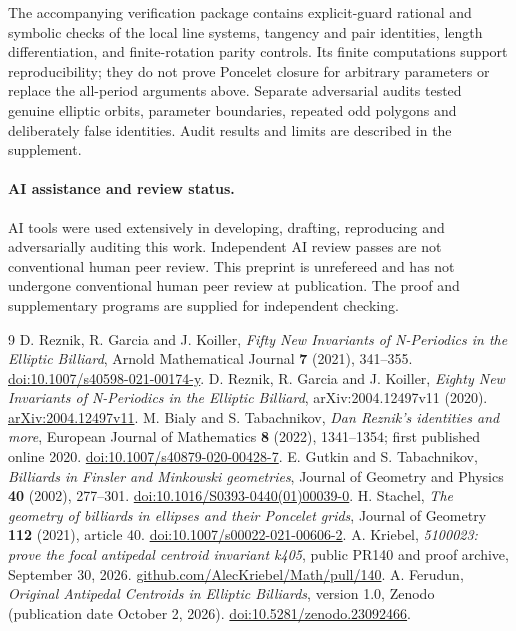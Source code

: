 \documentclass[11pt]{article}
\begin{document}
The accompanying verification package contains explicit-guard rational
and symbolic checks of the local line systems, tangency and pair
identities, length differentiation, and finite-rotation parity controls.
Its finite computations support reproducibility; they do not prove
Poncelet closure for arbitrary parameters or replace the all-period
arguments above. Separate adversarial audits tested genuine elliptic
orbits, parameter boundaries, repeated odd polygons and deliberately
false identities. Audit results and limits are described in the
supplement.

\paragraph{AI assistance and review status.}
AI tools were used extensively in developing, drafting, reproducing
and adversarially auditing this work. Independent AI review passes
are not conventional human peer review. This preprint is unrefereed
and has not undergone conventional human peer review at publication.
The proof and supplementary programs are supplied for independent
checking.

\begin{thebibliography}{9}
 D. Reznik, R. Garcia and J. Koiller,
\emph{Fifty New Invariants of N-Periodics in the Elliptic Billiard},
Arnold Mathematical Journal \textbf{7} (2021), 341--355.
\href{https://doi.org/10.1007/s40598-021-00174-y}{doi:10.1007/s40598-021-00174-y}.
 D. Reznik, R. Garcia and J. Koiller,
\emph{Eighty New Invariants of N-Periodics in the Elliptic Billiard},
arXiv:2004.12497v11 (2020).
\href{https://arxiv.org/abs/2004.12497v11}{arXiv:2004.12497v11}.
 M. Bialy and S. Tabachnikov,
\emph{Dan Reznik's identities and more}, European Journal of
Mathematics \textbf{8} (2022), 1341--1354; first published online 2020.
\href{https://doi.org/10.1007/s40879-020-00428-7}{doi:10.1007/s40879-020-00428-7}.
 E. Gutkin and S. Tabachnikov,
\emph{Billiards in Finsler and Minkowski geometries}, Journal of
Geometry and Physics \textbf{40} (2002), 277--301.
\href{https://doi.org/10.1016/S0393-0440(01)00039-0}{doi:10.1016/S0393-0440(01)00039-0}.
 H. Stachel,
\emph{The geometry of billiards in ellipses and their Poncelet grids},
Journal of Geometry \textbf{112} (2021), article 40.
\href{https://doi.org/10.1007/s00022-021-00606-2}{doi:10.1007/s00022-021-00606-2}.
 A. Kriebel, \emph{5100023: prove the focal antipedal
centroid invariant k405}, public PR140 and proof archive, September 30, 2026.
\href{https://github.com/AlecKriebel/Math/pull/140}{github.com/AlecKriebel/Math/pull/140}.
 A. Ferudun,
\emph{Original Antipedal Centroids in Elliptic Billiards}, version 1.0,
Zenodo (publication date October 2, 2026).
\href{https://doi.org/10.5281/zenodo.23092466}{doi:10.5281/zenodo.23092466}.
\end{thebibliography}
\end{document}
